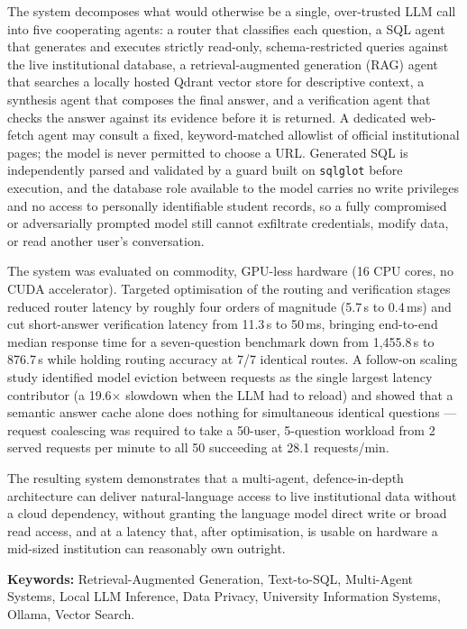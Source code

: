 \documentclass[11pt,a4paper,oneside]{report}
\begin{document}
The system decomposes what would otherwise be a single, over-trusted LLM call
into five cooperating agents: a router that classifies each question, a SQL
agent that generates and executes strictly read-only, schema-restricted
queries against the live institutional database, a retrieval-augmented
generation (RAG) agent that searches a locally hosted Qdrant vector store for
descriptive context, a synthesis agent that composes the final answer, and a
verification agent that checks the answer against its evidence before it is
returned. A dedicated web-fetch agent may consult a fixed, keyword-matched
allowlist of official institutional pages; the model is never permitted to
choose a URL. Generated SQL is independently parsed and validated by a guard
built on \texttt{sqlglot} before execution, and the database role available to
the model carries no write privileges and no access to personally
identifiable student records, so a fully compromised or adversarially
prompted model still cannot exfiltrate credentials, modify data, or read
another user's conversation.

The system was evaluated on commodity, GPU-less hardware (16 CPU cores, no
CUDA accelerator). Targeted optimisation of the routing and verification
stages reduced router latency by roughly four orders of magnitude (5.7\,s to
0.4\,ms) and cut short-answer verification latency from 11.3\,s to 50\,ms,
bringing end-to-end median response time for a seven-question benchmark down
from 1{,}455.8\,s to 876.7\,s while holding routing accuracy at 7/7 identical
routes. A follow-on scaling study identified model eviction between requests
as the single largest latency contributor (a 19.6$\times$ slowdown when the
LLM had to reload) and showed that a semantic answer cache alone does nothing
for simultaneous identical questions --- request coalescing was required to
take a 50-user, 5-question workload from 2 served requests per minute to all
50 succeeding at 28.1 requests/min.

The resulting system demonstrates that a multi-agent, defence-in-depth
architecture can deliver natural-language access to live institutional data
without a cloud dependency, without granting the language model direct write
or broad read access, and at a latency that, after optimisation, is usable on
hardware a mid-sized institution can reasonably own outright.

\vspace{0.8cm}
\noindent\textbf{Keywords:} Retrieval-Augmented Generation, Text-to-SQL,
Multi-Agent Systems, Local LLM Inference, Data Privacy, University Information
Systems, Ollama, Vector Search.
\end{document}
